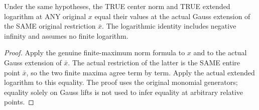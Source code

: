 \begin{corollary}
\label{local:actual-monomial-model-gauss-restriction}
\leanok
{}
Under the same hypotheses, the TRUE center norm and TRUE extended
logarithm at ANY original $x$ equal their values at the actual Gauss
extension of the SAME original restriction $\bar x$. The logarithmic
identity includes negative infinity and assumes no finite logarithm.
\end{corollary}
\begin{proof}
Apply the genuine finite-maximum norm formula to $x$ and to the actual
Gauss extension of $\bar x$. The actual restriction of the latter is the
SAME entire point $\bar x$, so the two finite maxima agree term by term.
Apply the actual extended logarithm to this equality. The proof uses the
original monomial generators; equality solely on Gauss lifts is not used
to infer equality at arbitrary relative points.
\end{proof}
